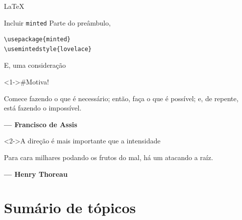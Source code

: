 \documentclass[bigger]{beamer}
\newenvironment{modern-quote}{\begin{quote}}{\end{quote}}
\begin{document}
{\begin{frame}[label={sec:orgd01ad83},fragile]{\LaTeX{}}
 \begin{block}{Incluir \texttt{minted}}
Parte do preâmbulo,
\begin{verbatim}
\usepackage{minted}
\usemintedstyle{lovelace}
\end{verbatim}
\transdissolve
\end{block}
\end{frame}

\begin{frame}[label={sec:org99344e0}]{E, uma consideração}
\begin{block}<1->{\alert{\#Motiva!}}
\begin{modern-quote}
Comece fazendo o que é necessário; então, faça o que é possível; e, de repente, está fazendo o impossível.
\end{modern-quote}
\begin{raggedleft}
\textbf{--- Francisco de Assis}
\par\end{raggedleft}
\transdissolve
\end{block}

\begin{block}<2->{\alert{A direção é mais importante que a intensidade}}
\begin{modern-quote}
Para cara milhares podando os frutos do mal, há um atacando a raíz.
\end{modern-quote}
\begin{raggedleft}
\textbf{--- Henry Thoreau}
\par\end{raggedleft}
\end{block}
\end{frame}

\section{Sumário de tópicos}
\label{sec:org85944d9}
}
\end{document}
